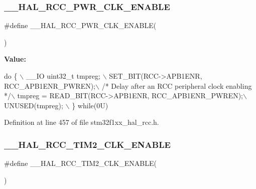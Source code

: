 \subsubsection{\texorpdfstring{\+\_\+\+\_\+\+H\+A\+L\+\_\+\+R\+C\+C\+\_\+\+P\+W\+R\+\_\+\+C\+L\+K\+\_\+\+E\+N\+A\+B\+LE}{\_\_HAL\_RCC\_PWR\_CLK\_ENABLE}}
{\footnotesize\ttfamily \#define \+\_\+\+\_\+\+H\+A\+L\+\_\+\+R\+C\+C\+\_\+\+P\+W\+R\+\_\+\+C\+L\+K\+\_\+\+E\+N\+A\+B\+LE(\begin{DoxyParamCaption}{ }\end{DoxyParamCaption})}

{\bfseries Value\+:}
\begin{DoxyCode}
\textcolor{keywordflow}{do} \{ \(\backslash\)
                                        \_\_IO uint32\_t tmpreg; \(\backslash\)
                                        SET\_BIT(RCC->APB1ENR, RCC\_APB1ENR\_PWREN);\(\backslash\)
                                        \textcolor{comment}{/* Delay after an RCC peripheral clock enabling */}\(\backslash\)
                                        tmpreg = READ\_BIT(RCC->APB1ENR, RCC\_APB1ENR\_PWREN);\(\backslash\)
                                        UNUSED(tmpreg); \(\backslash\)
                                      \} \textcolor{keywordflow}{while}(0U)
\end{DoxyCode}


Definition at line 457 of file stm32f1xx\+\_\+hal\+\_\+rcc.\+h.

\mbox{\label{group___r_c_c___a_p_b1___clock___enable___disable_ga2e895257faa38376b9cdfcd756909a43}} 
\subsubsection{\texorpdfstring{\+\_\+\+\_\+\+H\+A\+L\+\_\+\+R\+C\+C\+\_\+\+T\+I\+M2\+\_\+\+C\+L\+K\+\_\+\+E\+N\+A\+B\+LE}{\_\_HAL\_RCC\_TIM2\_CLK\_ENABLE}}
{\footnotesize\ttfamily \#define \+\_\+\+\_\+\+H\+A\+L\+\_\+\+R\+C\+C\+\_\+\+T\+I\+M2\+\_\+\+C\+L\+K\+\_\+\+E\+N\+A\+B\+LE(\begin{DoxyParamCaption}{ }\end{DoxyParamCaption})}

